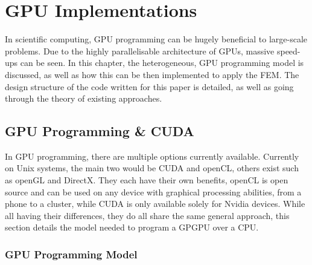 \clearpage
\chapter{GPU Implementations}

In scientific computing, GPU programming can be hugely beneficial to large-scale problems. Due to the highly parallelisable architecture of GPUs, massive speed-ups can be seen. In this chapter, the heterogeneous, GPU programming model is discussed, as well as how this can be then implemented to apply the FEM. The design structure of the code written for this paper is detailed, as well as going through the theory of existing approaches.

\section{GPU Programming \& CUDA}

In GPU programming, there are multiple options currently available. Currently on Unix systems, the main two would be CUDA and openCL, others exist such as openGL and DirectX. They each have their own benefits, openCL is open source and can be used on any device with graphical processing abilities, from a phone to a cluster, while CUDA is only available solely for Nvidia devices. While all having their differences, they do all share the same general approach, this section details the model needed to program a GPGPU over a CPU.

\subsection{GPU Programming Model}\label{gpu_model}

